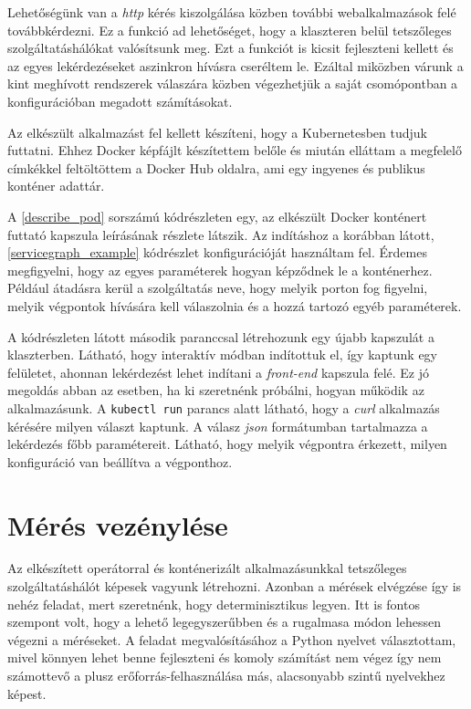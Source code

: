 Lehetőségünk van a \textit{http} kérés kiszolgálása közben további webalkalmazások felé továbbkérdezni. Ez a funkció ad lehetőséget, hogy a klaszteren belül tetszőleges szolgáltatáshálókat valósítsunk meg. Ezt a funkciót is kicsit fejleszteni kellett és az egyes lekérdezéseket aszinkron hívásra cseréltem le. Ezáltal miközben várunk a kint meghívott rendszerek válaszára közben végezhetjük a saját csomópontban a konfigurációban megadott számításokat. 

Az elkészült alkalmazást fel kellett készíteni, hogy a Kubernetesben tudjuk futtatni. Ehhez Docker képfájlt készítettem belőle és miután elláttam a megfelelő címkékkel feltöltöttem\citep{dockerContainer} a Docker Hub oldalra, ami egy ingyenes és publikus konténer adattár. \\

\lstset{caption=Kénténer futtatása és válasza, label=describe_pod}


A \ref{describe_pod} sorszámú kódrészleten egy, az elkészült Docker konténert futtató kapszula leírásának részlete látszik. Az indításhoz a korábban látott, \ref{servicegraph_example} kódrészlet konfigurációját használtam fel. Érdemes megfigyelni, hogy az egyes  paraméterek hogyan képződnek le a konténerhez. Például átadásra kerül a szolgáltatás neve, hogy melyik porton fog figyelni, melyik végpontok hívására kell válaszolnia és a hozzá tartozó egyéb paraméterek.

A kódrészleten látott második paranccsal létrehozunk egy újabb kapszulát a klaszterben. Látható, hogy interaktív módban indítottuk el, így kaptunk egy felületet, ahonnan lekérdezést lehet indítani a \textit{front-end} kapszula felé. Ez jó megoldás abban az esetben, ha ki szeretnénk próbálni, hogyan működik az alkalmazásunk. A \verb+kubectl run+ parancs alatt látható, hogy a \textit{curl} alkalmazás kérésére milyen választ kaptunk. A válasz \textit{json} formátumban tartalmazza a lekérdezés főbb paramétereit. Látható, hogy melyik végpontra érkezett, milyen konfiguráció van beállítva a végponthoz.



\section{Mérés vezénylése}
\label{sec:measure_orchestrate}
Az elkészített operátorral és konténerizált alkalmazásunkkal tetszőleges szolgáltatáshálót képesek vagyunk létrehozni.
Azonban a mérések elvégzése így is nehéz feladat, mert szeretnénk, hogy determinisztikus legyen. Itt is fontos szempont volt, hogy a lehető legegyszerűbben és a rugalmasa módon lehessen végezni a méréseket. 
A feladat megvalósításához a Python nyelvet választottam, mivel könnyen lehet benne fejleszteni és komoly számítást nem végez így nem számottevő a plusz erőforrás-felhasználása más, alacsonyabb szintű nyelvekhez képest. 

